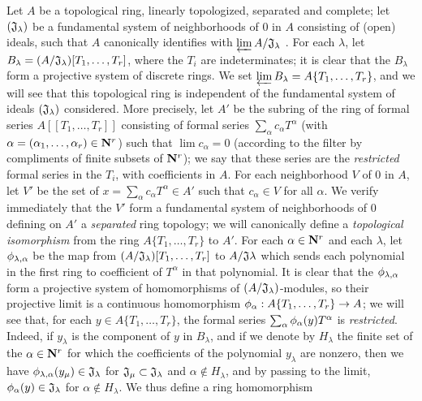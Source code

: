 \begin{env}[7.5.1]
\label{0.7.5.1}
Let $A$ be a topological ring, linearly topologized, separated and complete; let
$(\mathfrak{J}_\lambda)$ be a fundamental system of neighborhoods of $0$ in $A$
consisting of (open) ideals, such that $A$ canonically identifies with
$\varprojlim A/\mathfrak{J}_\lambda$ . For each
$\lambda$, let $B_\lambda=(A/\mathfrak{J}_\lambda)[T_1,\dots,T_r]$, where the
$T_i$ are indeterminates; it is clear that the $B_\lambda$ form a projective system
of discrete rings. We set $\varprojlim B_\lambda=A\{T_1,\dots,T_r\}$, and we will
see that this topological ring is independent of the fundamental system of ideals
$(\mathfrak{J}_\lambda)$ considered. More precisely, let $A'$ be the subring of the
ring of formal series $A[\![T_1,\dots,T_r]\!]$ consisting of formal series
$\sum_\alpha c_\alpha T^\alpha$ (with $\alpha=(\alpha_1,\dots,\alpha_r)\in\mathbf{N}^r$)
such that $\lim c_\alpha=0$ (according to the filter by compliments of finite subsets
of $\mathbf{N}^r$); we say that these series are the \emph{restricted} formal series in the
$T_i$, with coefficients in $A$.
For each neighborhood $V$ of $0$ in $A$, let $V'$ be the set of
$x=\sum_\alpha c_\alpha T^\alpha\in A'$ such that $c_\alpha\in V$ for all $\alpha$.
We verify immediately that the $V'$ form a fundamental system of neighborhoods of $0$
defining on $A'$ a \emph{separated} ring topology; we will canonically define a
\emph{topological isomorphism} from the ring $A\{T_1,\dots,T_r\}$ to $A'$. For each
$\alpha\in\mathbf{N}^r$ and each $\lambda$, let $\phi_{\lambda,\alpha}$ be the map from
$(A/\mathfrak{J}_\lambda)[T_1,\dots,T_r]$ to $A/\mathfrak{J}\lambda$ which sends each
polynomial in the first ring to coefficient of $T^\alpha$ in that polynomial. It is
clear that the $\phi_{\lambda,\alpha}$ form a projective system of homomorphisms of
$(A/\mathfrak{J}_\lambda)$-modules, so their projective limit is a continuous
homomorphism $\phi_\alpha:A\{T_1,\dots,T_r\}\to A$; we will see that, for each
$y\in A\{T_1,\dots,T_r\}$, the formal series $\sum_\alpha\phi_\alpha(y)T^\alpha$ is
\emph{restricted}. Indeed, if $y_\lambda$ is the component of $y$ in $B_\lambda$, and
if we denote by $H_\lambda$ the finite set of the $\alpha\in\mathbf{N}^r$ for which the
coefficients of the polynomial $y_\lambda$ are nonzero, then we have
$\phi_{\lambda,\alpha}(y_\mu)\in\mathfrak{J}_\lambda$ for
$\mathfrak{J}_\mu\subset\mathfrak{J}_\lambda$ and $\alpha\not\in H_\lambda$, and by
passing to the limit, $\phi_\alpha(y)\in\mathfrak{J}_\lambda$ for
$\alpha\not\in H_\lambda$. We thus define a ring homomorphism

\end{env}
